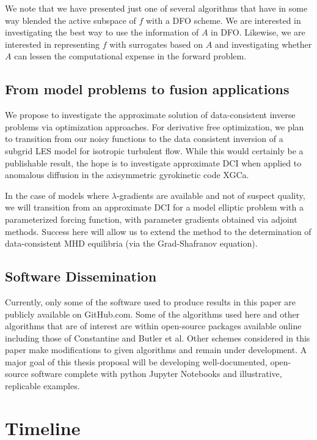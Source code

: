 \documentclass{amsart}
\begin{document}
We note that we have presented just one of several algorithms that have in some way blended the active subspace of $f$ with a DFO scheme. We are interested in investigating the best way to use the information of $A$ in DFO. Likewise, we are interested in representing $f$ with surrogates based on $A$ and investigating whether $A$ can lessen the computational expense in the forward problem.

\subsection{From model problems to fusion applications}

We propose to investigate the approximate solution of data-consistent inverse problems via optimization approaches.  For derivative free optimization, we plan to transition from our noisy
functions to the data consistent inversion of a subgrid LES model for isotropic turbulent flow.  
While this would certainly be a publishable result, the hope is to investigate approximate DCI
when applied to anomalous diffusion in the axisymmetric gyrokinetic code XGCa.

In the case of models where $\lambda$-gradients are available and not of suspect quality, we will
transition from an approximate DCI for a model elliptic problem with a parameterized forcing function, with parameter gradients obtained via adjoint methods.  Success here will allow us to extend the
method to the determination of data-consistent MHD equilibria (via the Grad-Shafranov equation).  





\subsection{Software Dissemination}

Currently, only some of the software used to produce results in this paper are publicly available on GitHub.com. Some of the algorithms used here and other algorithms that are of interest are within open-source packages available online including those of Constantine and Butler et al. Other schemes considered in this paper make modifications to given algorithms and remain under development. A major goal of this thesis proposal will be developing well-documented, open-source software complete with python Jupyter Notebooks and illustrative, replicable examples.

\section{Timeline}
\end{document}
